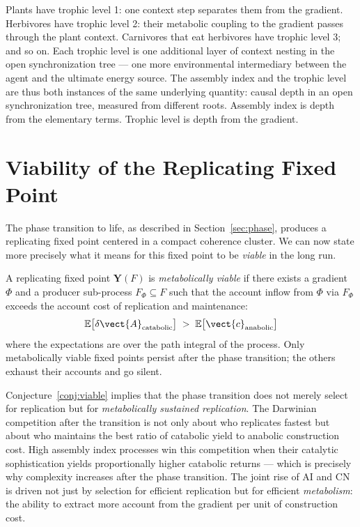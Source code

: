 \begin{remark}
Plants have trophic level 1: one context step separates them
from the gradient.
Herbivores have trophic level 2: their metabolic coupling to
the gradient passes through the plant context.
Carnivores that eat herbivores have trophic level 3; and so on.
Each trophic level is one additional layer of context nesting
in the open synchronization tree --- one more environmental
intermediary between the agent and the ultimate energy source.
The assembly index and the trophic level are thus both instances
of the same underlying quantity: causal depth in an open
synchronization tree, measured from different roots.
Assembly index is depth from the elementary terms.
Trophic level is depth from the gradient.
\end{remark}

\section{Viability of the Replicating Fixed Point}

The phase transition to life, as described in
Section~\ref{sec:phase}, produces a replicating fixed point
centered in a compact coherence cluster.
We can now state more precisely what it means for this fixed
point to be \emph{viable} in the long run.

\begin{conjecture}
\label{conj:viable}
A replicating fixed point $\mathbf{Y}(F)$ is \emph{metabolically
viable} if there exists a gradient $\Phi$ and a producer
sub-process $F_\Phi \subseteq F$ such that the account inflow
from $\Phi$ via $F_\Phi$ exceeds the account cost of replication
and maintenance:
\[
  \mathbb{E}\bigl[\delta\vect{A}_{\text{catabolic}}\bigr]
  \;>\;
  \mathbb{E}\bigl[\vect{c}_{\text{anabolic}}\bigr]
\]
where the expectations are over the path integral of the process.
Only metabolically viable fixed points persist after the phase
transition; the others exhaust their accounts and go silent.
\end{conjecture}

\begin{remark}
Conjecture~\ref{conj:viable} implies that the phase transition
does not merely select for replication but for
\emph{metabolically sustained replication}.
The Darwinian competition after the transition is not only
about who replicates fastest but about who maintains the best
ratio of catabolic yield to anabolic construction cost.
High assembly index processes win this competition when their
catalytic sophistication yields proportionally higher catabolic
returns --- which is precisely why complexity increases after
the phase transition.
The joint rise of $\mathrm{AI}$ and $\mathrm{CN}$ is driven not
just by selection for efficient replication but for efficient
\emph{metabolism}: the ability to extract more account from the
gradient per unit of construction cost.
\end{remark}

